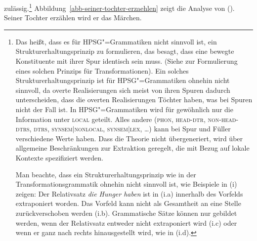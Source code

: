 zulässig.\footnote{
        Das heißt, dass es für HPSG"=Grammatiken nicht sinnvoll ist, ein Strukturerhaltungsprinzip
        zu formulieren,
        das besagt, dass eine bewegte Konstituente mit ihrer Spur identisch sein muss. (Siehe \zb
         zur Formulierung eines solchen Prinzips für Transformationen). Ein solches Strukturerhaltungsprinzip
        ist für HPSG"=Grammatiken ohnehin nicht sinnvoll, da overte Realisierungen sich meist von
        ihren Spuren dadurch unterscheiden, dass die overten Realisierungen Töchter haben, was bei Spuren
        nicht der Fall ist. In HPSG"=Grammatiken wird für gewöhnlich nur die Information unter \textsc{local}
        geteilt. Alles andere (\textsc{phon}, \textsc{head-dtr}, \textsc{non-head-dtrs}, \textsc{dtrs}, \textsc{synsem$|$nonlocal},
        \textsc{synsem$|$lex}, \ldots) kann bei Spur und Füller verschiedene Werte haben. Dass die Theorie nicht übergeneriert,
        wird über allgemeine Beschränkungen zur Extraktion geregelt, die mit Bezug auf lokale Kontexte
        spezifiziert werden.

        Man beachte, dass ein Strukturerhaltungsprinzip wie in der Transformationsgrammatik ohnehin
        nicht sinnvoll ist, wie  Beispiele in (i) zeigen:
        \eal
        \zl
        Der Relativsatz \emph{die Hunger haben} ist in (i.a) innerhalb des Vorfelds extraponiert worden. Das
        Vorfeld kann nicht als Gesamtheit an eine Stelle zurückverschoben werden (i.b). Grammatische Sätze
        können nur gebildet werden, wenn der Relativsatz entweder nicht extraponiert wird (i.c) oder
        wenn er ganz nach rechts hinausgestellt wird, wie in (i.d).
}
Abbildung~\ref{abb-seiner-tochter-erzaehlen} zeigt die Analyse von ().
\ea
Seiner Tochter erzählen wird er das Märchen.
\z
\pagebreak
